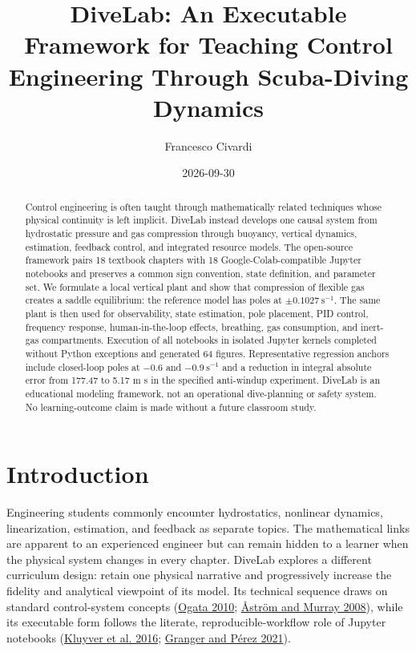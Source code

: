 \documentclass[
]{article}
\title{DiveLab: An Executable Framework for Teaching Control Engineering
Through Scuba-Diving Dynamics}
\author{Francesco Civardi}
\date{2026-09-30}
\begin{document}
\maketitle
\begin{abstract}
Control engineering is often taught through mathematically related
techniques whose physical continuity is left implicit. DiveLab instead
develops one causal system from hydrostatic pressure and gas compression
through buoyancy, vertical dynamics, estimation, feedback control, and
integrated resource models. The open-source framework pairs 18 textbook
chapters with 18 Google-Colab-compatible Jupyter notebooks and preserves
a common sign convention, state definition, and parameter set. We
formulate a local vertical plant and show that compression of flexible
gas creates a saddle equilibrium: the reference model has poles at
\(\pm0.1027\ \mathrm{s}^{-1}\). The same plant is then used for
observability, state estimation, pole placement, PID control, frequency
response, human-in-the-loop effects, breathing, gas consumption, and
inert-gas compartments. Execution of all notebooks in isolated Jupyter
kernels completed without Python exceptions and generated 64 figures.
Representative regression anchors include closed-loop poles at \(-0.6\)
and \(-0.9\
\mathrm{s}^{-1}\) and a reduction in integral absolute error from 177.47
to 5.17 m s in the specified anti-windup experiment. DiveLab is an
educational modeling framework, not an operational dive-planning or
safety system. No learning-outcome claim is made without a future
classroom study.
\end{abstract}

\hypertarget{introduction}{%
\section{Introduction}\label{introduction}}

Engineering students commonly encounter hydrostatics, nonlinear
dynamics, linearization, estimation, and feedback as separate topics.
The mathematical links are apparent to an experienced engineer but can
remain hidden to a learner when the physical system changes in every
chapter. DiveLab explores a different curriculum design: retain one
physical narrative and progressively increase the fidelity and
analytical viewpoint of its model. Its technical sequence draws on
standard control-system concepts
(\protect\hyperlink{ref-ogata2010}{Ogata 2010};
\protect\hyperlink{ref-astrom2008}{Åström and Murray 2008}), while its
executable form follows the literate, reproducible-workflow role of
Jupyter notebooks (\protect\hyperlink{ref-kluyver2016}{Kluyver et al.
2016}; \protect\hyperlink{ref-granger2021}{Granger and Pérez 2021}).
\end{document}
